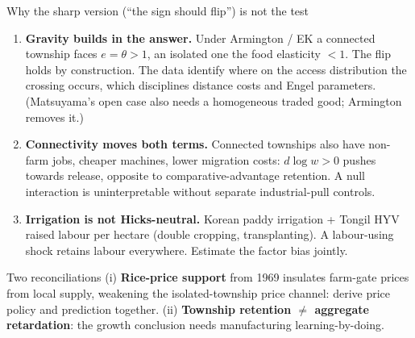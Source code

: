 \documentclass[10pt,aspectratio=169]{beamer}
\newcommand{\hl}[1]{\textcolor{mOrange}{#1}}
\begin{document}
\begin{frame}{Why the sharp version (``the sign should flip'') is not the test}
  \footnotesize
  \begin{enumerate}
    \item \textbf{Gravity builds in the answer.} Under Armington / EK a connected township
          faces $e=\theta>1$, an isolated one the food elasticity $<1$. The flip holds by
          construction. The data identify \hl{where} on the access distribution the
          crossing occurs, which disciplines distance costs and Engel parameters.
          (Matsuyama's open case also needs a homogeneous traded good; Armington removes it.)
    \item \textbf{Connectivity moves both terms.} Connected townships also have non-farm
          jobs, cheaper machines, lower migration costs: $d\log w>0$ pushes towards release,
          opposite to comparative-advantage retention. A null interaction is
          uninterpretable without separate industrial-pull controls.
    \item \textbf{Irrigation is not Hicks-neutral.} Korean paddy irrigation + Tongil HYV
          raised labour per hectare (double cropping, transplanting). A labour-using shock
          retains labour everywhere. Estimate the factor bias jointly.
  \end{enumerate}
  \begin{alertblock}{Two reconciliations}
    \footnotesize
    (i) \textbf{Rice-price support} from 1969 insulates farm-gate prices from local supply,
    weakening the isolated-township price channel: derive price policy and prediction
    together. (ii) \textbf{Township retention $\neq$ aggregate retardation}: the growth
    conclusion needs manufacturing learning-by-doing.
  \end{alertblock}
\end{frame}
\end{document}
